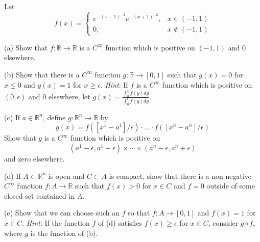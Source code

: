 \begin{exercise}{26}
    Let
    $$f(x) = \begin{cases}
        e^{-(x-1)^{-2}}e^{-(x+1)^{-2}}, & x \in (-1, 1) \\
        0, & x \notin (-1, 1)
    \end{cases}$$
    
    (a) Show that $f: \mathbb{R} \rightarrow \mathbb{R}$ is a $C^{\infty}$ function which is positive on $(-1, 1)$ and 0 elsewhere.

    (b) Show that there is a $C^{\infty}$ function $g: \mathbb{R} \rightarrow [0, 1]$ such that $g(x) = 0$ for $x \leq 0$ and $g(x) = 1$ for $x \geq \epsilon$. \textit{Hint}: If $f$ is a $C^{\infty}$ function which is positive on $(0, \epsilon)$ and 0 elsewhere, let $g(x) = \frac{\int_{0}^{x}f(y) dy}{\int_{0}^{\epsilon} f(y) dy}$.

    (c) If $a \in \mathbb{R}^n$, define $g: \mathbb{R}^n \rightarrow \mathbb{R}$ by
    $$g(x) = f([x^1 - a^1]/\epsilon) \cdot \ldots \cdot f([x^n - a^n] / \epsilon)$$
    Show that $g$ is a $C^\infty$ function which is positive on
    $$(a^1 - \epsilon, a^1 + \epsilon) \times \cdots \times (a^n - \epsilon, a^n + \epsilon)$$
    and zero elsewhere.

    (d) If $A \subset \mathbb{R}^n$ is open and $C \subset A$ is compact, show that there is a non-negative $C^\infty$ function $f: A \rightarrow \mathbb{R}$ such that $f(x) > 0$ for $x \in C$ and $f = 0$ outside of some closed set contained in $A$.

    (e) Show that we can choose such an $f$ so that $f: A \rightarrow [0, 1]$ and $f(x) = 1$ for $x \in C$. \textit{Hint}: If the function $f$ of (d) satisfies $f(x) \geq \epsilon$ for $x \in C$, consider $g \circ f$, where $g$ is the function of (b).
\end{exercise}

